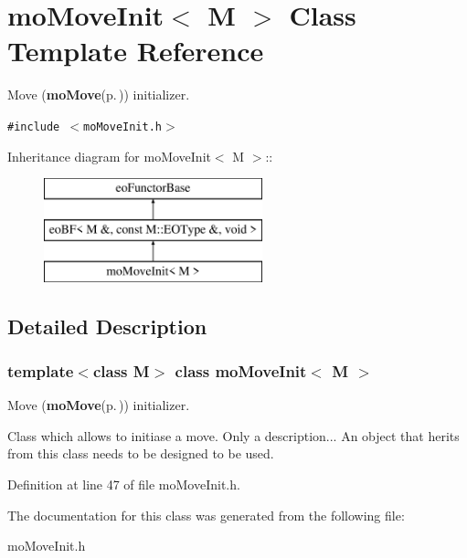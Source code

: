 \section{mo\-Move\-Init$<$ M $>$ Class Template Reference}
\label{classmo_move_init}
Move ({\bf mo\-Move}{\rm (p.\,\pageref{classmo_move})}) initializer.  


{\tt \#include $<$mo\-Move\-Init.h$>$}

Inheritance diagram for mo\-Move\-Init$<$ M $>$::\begin{figure}[H]
\begin{center}
\leavevmode
\includegraphics[height=3cm]{classmo_move_init}
\end{center}
\end{figure}


\subsection{Detailed Description}
\subsubsection*{template$<$class M$>$ class mo\-Move\-Init$<$ M $>$}

Move ({\bf mo\-Move}{\rm (p.\,\pageref{classmo_move})}) initializer. 

Class which allows to initiase a move. Only a description... An object that herits from this class needs to be designed to be used. 



Definition at line 47 of file mo\-Move\-Init.h.

The documentation for this class was generated from the following file:\begin{CompactItemize}
\item 
mo\-Move\-Init.h\end{CompactItemize}
